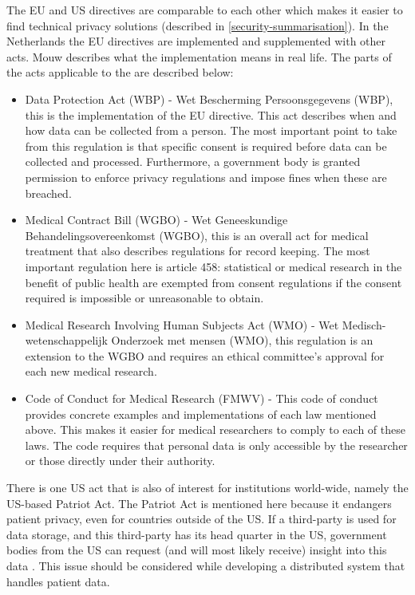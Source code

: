 The EU and US directives are comparable to each other which makes it easier to find technical privacy solutions (described in \ref{security-summarisation}).
In the Netherlands the EU directives are implemented and supplemented with other acts.
Mouw \cite{s19Mouw2012} describes what the implementation means in real life. 
The  parts of the acts applicable to the \ivfsystem{} are described below:

\begin{itemize}
	\item Data Protection Act (WBP) - Wet Bescherming Persoonsgegevens (WBP), this is the implementation of the EU directive.
	This act describes when and how data can be collected from a person.
	The most important point to take from this regulation is that specific consent is required before data can be collected and processed.
	Furthermore, a government body is granted permission to enforce privacy regulations and impose fines when these are breached.
	\item Medical Contract Bill (WGBO) - Wet Geneeskundige Behandelingsovereenkomst (WGBO), this is an overall act for medical treatment that also describes regulations for record keeping.
	The most important regulation here is article 458: statistical or medical research in the benefit of public health are exempted from consent regulations if the consent required is impossible or unreasonable to obtain.
	\item Medical Research Involving Human Subjects Act (WMO) - Wet Medisch-wetenschappelijk Onderzoek met mensen (WMO), this regulation is an extension to the WGBO and requires an ethical committee's approval for each new medical research.
	\item Code of Conduct for Medical Research (FMWV) - This code of conduct provides concrete examples and implementations of each law mentioned above.
	This makes it easier for medical researchers to comply to each of these laws.
	The code requires that personal data is only accessible by the researcher or those directly under their authority.
\end{itemize}

There is one US act that is also of interest for institutions world-wide, namely the US-based Patriot Act.
The Patriot Act is mentioned here because it endangers patient privacy, even for countries outside of the US.
If a third-party is used for data storage, and this third-party has its head quarter in the US, government bodies from the US can request (and will most likely receive) insight into this data \cite{s7Kluge2007}.
This issue should be considered while developing a distributed system that handles patient data.

